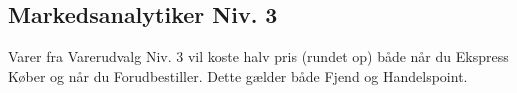 \subsection{Markedsanalytiker Niv. 3}
Varer fra Varerudvalg Niv. 3 vil koste halv pris (rundet op) både når du Ekspress Køber og når du Forudbestiller. Dette gælder både Fjend og Handelspoint.\\




